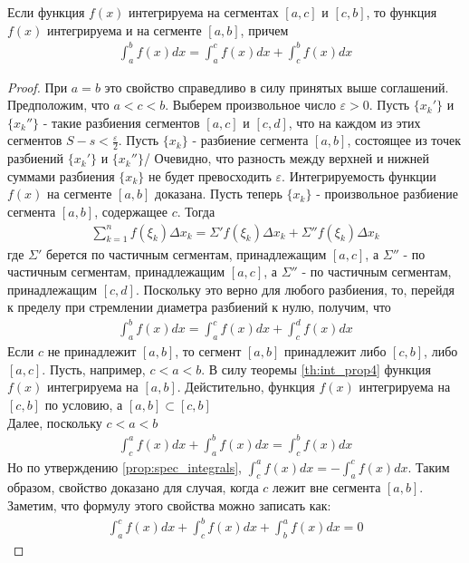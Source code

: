 \documentclass[10pt]{article}
\begin{document}
    \begin{theorem}
        Если функция $f(x)$ интегрируема на сегментах $[a, c]$ и $[c, b]$, то функция $f(x)$ интегрируема и на сегменте $[a, b]$, причем
        \begin{gather*}
            \int_a^b f(x) dx = \int_a^c f(x) dx + \int_c^b f(x) dx
        \end{gather*}
        \label{th:int_prop5}
    \end{theorem}
    \begin{proof}
        При $a = b$ это свойство справедливо в силу принятых выше соглашений.\\
        Предположим, что $a < c < b$. Выберем произвольное число $\varepsilon > 0$. Пусть $\{x_k'\}$ и $\{x_k''\}$ - такие разбиения сегментов $[a, c]$ и $[c, d]$, что на каждом из этих сегментов $S-s < \frac{\varepsilon}{2}$. Пусть $\{x_k\}$ - разбиение сегмента $[a, b]$, состоящее из точек разбиений $\{x_k'\}$ и $\{x_k''\}$/ Очевидно, что разность между верхней и нижней суммами разбиения $\{x_k\}$ не будет превосходить $\varepsilon$. Интегрируемость функции $f(x)$ на сегменте $[a, b]$ доказана. Пусть теперь $\{x_k\}$ - произвольное разбиение сегмента $[a, b]$, содержащее $c$. Тогда
        \begin{gather*}
            \sum_{k=1}^n f(\xi_k) \Delta x_k = \Sigma' f(\xi_k) \Delta x_k + \Sigma'' f(\xi_k) \Delta x_k
        \end{gather*}
        где $\Sigma'$ берется по частичным сегментам, принадлежащим $[a, c]$, а $\Sigma''$ - по частичным сегментам, принадлежащим $[a, c]$, а $\Sigma''$ - по частичным сегментам, принадлежащим $[c, d]$. Поскольку это верно для любого разбиения, то, перейдя к пределу при стремлении диаметра разбиений к нулю, получим, что
        \begin{gather*}
            \int_a^b f(x) dx = \int_a^c f(x) dx + \int_c^d f(x) dx
        \end{gather*}
        Если $c$ не принадлежит $[a, b]$, то сегмент $[a, b]$ принадлежит либо $[c, b]$, либо $[a, c]$. Пусть, например, $c < a < b$. В силу теоремы \ref{th:int_prop4} функция $f(x)$ интегрируема на $[a, b]$. Дейстительно, функция $f(x)$ интегрируема на $[c, b]$ по условию, а $[a, b] \subset [c, b]$\\
        Далее, поскольку $c < a < b$
        \begin{gather*}
            \int_c^a f(x) dx + \int_a^b f(x) dx = \int_c^b f(x) dx
        \end{gather*}
        Но по утверждению \ref{prop:spec_integrals}, $\int_c^a f(x) dx = -\int_a^c f(x) dx$. Таким образом, свойство доказано для случая, когда $c$ лежит вне сегмента $[a, b]$. Заметим, что формулу этого свойства можно записать как:
        \begin{gather*}
            \int_a^c f(x) dx + \int_c^b f(x) dx + \int_b^a f(x) dx = 0
        \end{gather*}
    \end{proof}
\end{document}
